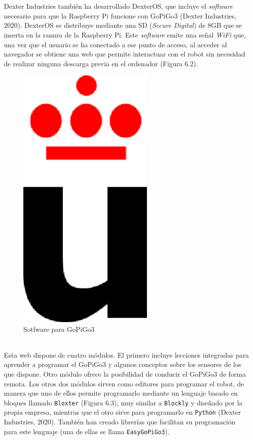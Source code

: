 \\
\\
Dexter Industries también ha desarrollado DexterOS, que incluye el \textit{software} necesario para que la Raspberry Pi funcione con GoPiGo3 (Dexter Industries, 2020). DexterOS se distribuye mediante una SD (\textit{Secure Digital}) de 8GB que se inserta en la ranura de la Raspberry Pi. Este \textit{software} emite una señal \textit{WiFi} que, una vez que el usuario se ha conectado a ese punto de acceso, al acceder al navegador se obtiene una web que permite interactuar con el robot sin necesidad de realizar ninguna descarga previa en el ordenador (Figura 6.2).
\\
\begin{figure}[h!]
  \centering
    \includegraphics[width=0.6\textwidth]{img/logo_vect.png}
  \caption{Sotfware para GoPiGo3}
  \label{Sotfware para GoPiGo3}
\end{figure}
\\
Esta web dispone de cuatro módulos. El primero incluye lecciones integradas para aprender a programar el GoPiGo3 y algunos conceptos sobre los sensores de los que dispone. Otro módulo ofrece la posibilidad de conducir el GoPiGo3 de forma remota. Los otros dos módulos sirven como editores para programar el robot, de manera que uno de ellos permite programarlo mediante un lenguaje basado en bloques llamado \texttt{Bloxter} (Figura 6.3), muy similar a \texttt{Blockly} y diseñado por la propia empresa, mientras que el otro sirve para programarlo en \texttt{Python} (Dexter Industries, 2020). También han creado librerías que facilitan su programación para este lenguaje (una de ellas se llama \texttt{EasyGoPiGo3}).
\\


